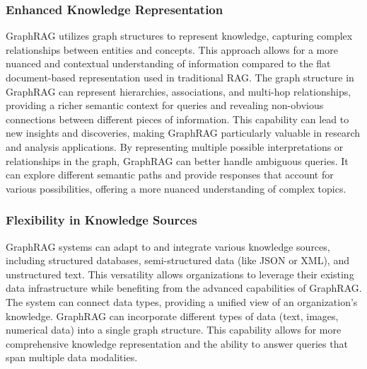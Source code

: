 \documentclass[lettersize,journal]{IEEEtran}
\begin{document}
\subsubsection{Enhanced Knowledge Representation}
GraphRAG utilizes graph structures to represent knowledge, capturing complex relationships between entities and concepts. This approach allows for a more nuanced and contextual understanding of information compared to the flat document-based representation used in traditional RAG. The graph structure in GraphRAG can represent hierarchies, associations, and multi-hop relationships, providing a richer semantic context for queries and revealing non-obvious connections between different pieces of information. This capability can lead to new insights and discoveries, making GraphRAG particularly valuable in research and analysis applications.
 By representing multiple possible interpretations or relationships in the graph, GraphRAG can better handle ambiguous queries. It can explore different semantic paths and provide responses that account for various possibilities, offering a more nuanced understanding of complex topics.

\subsubsection{Flexibility in Knowledge Sources} GraphRAG systems can adapt to and integrate various knowledge sources, including structured databases, semi-structured data (like JSON or XML), and unstructured text. This versatility allows organizations to leverage their existing data infrastructure while benefiting from the advanced capabilities of GraphRAG. The system can connect data types, providing a unified view of an organization's knowledge. GraphRAG can incorporate different types of data (text, images, numerical data) into a single graph structure. This capability allows for more comprehensive knowledge representation and the ability to answer queries that span multiple data modalities.
\end{document}
